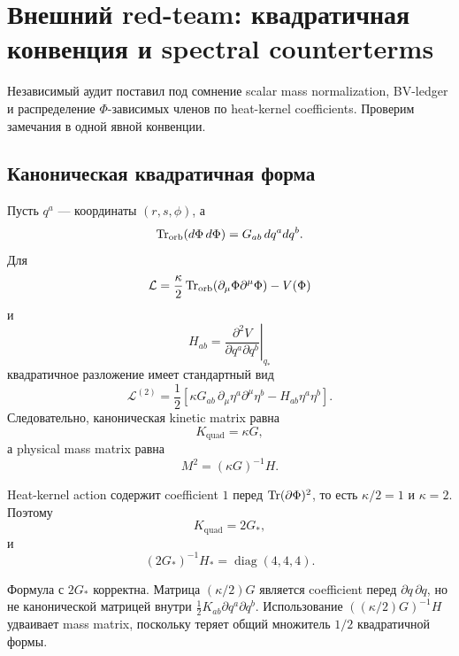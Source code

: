 \chapter{Внешний red-team: квадратичная конвенция и spectral counterterms}

Независимый аудит поставил под сомнение scalar mass normalization,
BV-ledger и распределение \(\Phi\)-зависимых членов по heat-kernel
coefficients. Проверим замечания в одной явной конвенции.

\section{Каноническая квадратичная форма}

Пусть \(q^a\) --- координаты \((r,s,\phi)\), а
\begin{equation}
 \operatorname{Tr}_{\mathrm{orb}}(d\Phi\,d\Phi)
 =G_{ab}\,dq^a dq^b.
\end{equation}
Для
\begin{equation}
 \mathcal L
 =
 \frac{\kappa}{2}
 \operatorname{Tr}_{\mathrm{orb}}(\partial_\mu\Phi\partial^\mu\Phi)
 -V(\Phi)
\end{equation}
и
\begin{equation}
 H_{ab}
 =
 \left.
 \frac{\partial^2V}{\partial q^a\partial q^b}
 \right|_{q_*}
\end{equation}
квадратичное разложение имеет стандартный вид
\begin{equation}
 \mathcal L^{(2)}
 =
 \frac12
 \left[
 \kappa G_{ab}\,
 \partial_\mu\eta^a\partial^\mu\eta^b
 -
 H_{ab}\eta^a\eta^b
 \right].
\end{equation}
Следовательно, каноническая kinetic matrix равна
\begin{equation}
 K_{\mathrm{quad}}=\kappa G,
\end{equation}
а physical mass matrix равна
\begin{equation}
 M^2=(\kappa G)^{-1}H.
\end{equation}

Heat-kernel action содержит coefficient \(1\) перед
\(\operatorname{Tr}(\partial\Phi)^2\), то есть \(\kappa/2=1\) и \(\kappa=2\).
Поэтому
\begin{equation}
 K_{\mathrm{quad}}=2G_*,
\end{equation}
и
\begin{equation}
 (2G_*)^{-1}H_*
 =\operatorname{diag}(4,4,4).
\end{equation}

\begin{theorem}
Формула с \(2G_*\) корректна. Матрица
\((\kappa/2)G\) является coefficient перед
\(\partial q\,\partial q\), но не канонической матрицей внутри
\(\frac12K_{ab}\partial q^a\partial q^b\). Использование
\(((\kappa/2)G)^{-1}H\) удваивает mass matrix, поскольку теряет общий
множитель \(1/2\) квадратичной формы.
\end{theorem}

